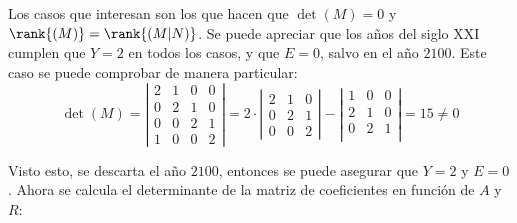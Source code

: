 \documentclass[../../main.tex]{subfiles}
\begin{document}
  Los casos que interesan son los que hacen que $\det{(M)} = 0$ y $\rank{(M)} = \rank{(M | N)}$. Se puede apreciar que los años del siglo XXI cumplen que $Y = 2$ en todos los casos, y que $E = 0$, salvo en el año $2100$. Este caso se puede comprobar de manera particular:
  $$
  \det{(M)} = \left|
    \begin{matrix}
      2 & 1 & 0 & 0 \\
      0 & 2 & 1 & 0 \\
      0 & 0 & 2 & 1 \\
      1 & 0 & 0 & 2
    \end{matrix}
  \right| = 2 \cdot \left |
    \begin{matrix}
      2 & 1 & 0 \\
      0 & 2 & 1 \\
      0 & 0 & 2
    \end{matrix}
  \right| - \left|
    \begin{matrix}
      1 & 0 & 0 \\
      2 & 1 & 0 \\
      0 & 2 & 1 \\
    \end{matrix}
  \right| = 15 \ne 0
  $$

  Visto esto, se descarta el año $2100$, entonces se puede asegurar que $Y = 2$ y $E = 0$. Ahora se calcula el determinante de la matriz de coeficientes en función de $A$ y $R$:
\end{document}
